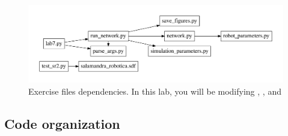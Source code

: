 \documentclass{cmc}
\begin{document}
\begin{figure}[ht]
  \centering \includegraphics[width=1.0\textwidth]{figures/files}
  \caption{\label{fig:files} Exercise files dependencies. In this lab, you will
    be modifying , ,
     and }
\end{figure}


\subsection*{Code organization}
\label{subsec:code}
\end{document}
